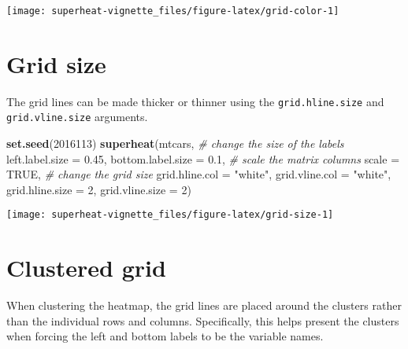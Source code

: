 \documentclass[]{book}
\newenvironment{Shaded}{\begin{snugshade}}{\end{snugshade}}
\newcommand{\KeywordTok}[1]{\textcolor[rgb]{0.13,0.29,0.53}{\textbf{{#1}}}}
\newcommand{\DataTypeTok}[1]{\textcolor[rgb]{0.13,0.29,0.53}{{#1}}}
\newcommand{\DecValTok}[1]{\textcolor[rgb]{0.00,0.00,0.81}{{#1}}}
\newcommand{\FloatTok}[1]{\textcolor[rgb]{0.00,0.00,0.81}{{#1}}}
\newcommand{\StringTok}[1]{\textcolor[rgb]{0.31,0.60,0.02}{{#1}}}
\newcommand{\CommentTok}[1]{\textcolor[rgb]{0.56,0.35,0.01}{\textit{{#1}}}}
\newcommand{\OtherTok}[1]{\textcolor[rgb]{0.56,0.35,0.01}{{#1}}}
\newcommand{\NormalTok}[1]{{#1}}
\theoremstyle{definition}
\theoremstyle{definition}
\theoremstyle{remark}
\begin{document}
\begin{center}\texttt{[image: superheat-vignette\_files/figure-latex/grid-color-1]} \end{center}

\section{Grid size}\label{grid-size}

The grid lines can be made thicker or thinner using the
\texttt{grid.hline.size} and \texttt{grid.vline.size} arguments.

\begin{Shaded}
\begin{Highlighting}[]
\KeywordTok{set.seed}\NormalTok{(}\DecValTok{2016113}\NormalTok{)}
\KeywordTok{superheat}\NormalTok{(mtcars,}
          \CommentTok{# change the size of the labels}
          \DataTypeTok{left.label.size =} \FloatTok{0.45}\NormalTok{,}
          \DataTypeTok{bottom.label.size =} \FloatTok{0.1}\NormalTok{,}
          \CommentTok{# scale the matrix columns}
          \DataTypeTok{scale =} \OtherTok{TRUE}\NormalTok{,}
          \CommentTok{# change the grid size}
          \DataTypeTok{grid.hline.col =} \StringTok{"white"}\NormalTok{,}
          \DataTypeTok{grid.vline.col =} \StringTok{"white"}\NormalTok{,}
          \DataTypeTok{grid.hline.size =} \DecValTok{2}\NormalTok{,}
          \DataTypeTok{grid.vline.size =} \DecValTok{2}\NormalTok{)}
\end{Highlighting}
\end{Shaded}

\begin{center}\texttt{[image: superheat-vignette\_files/figure-latex/grid-size-1]} \end{center}

\section{Clustered grid}\label{clustered-grid}

When clustering the heatmap, the grid lines are placed around the
clusters rather than the individual rows and columns. Specifically, this
helps present the clusters when forcing the left and bottom labels to be
the variable names.
\end{document}
